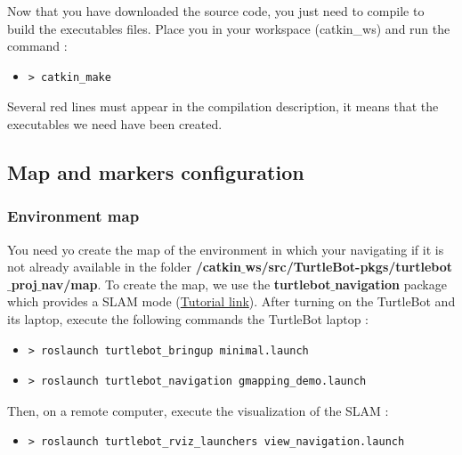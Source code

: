 \documentclass[10pt,a4paper]{article}
\begin{document}
Now that you have downloaded the source code, you just need to compile to build the executables files. Place you in your workspace (catkin\_ws) and run the command : 

\begin{itemize}
\item[]  \begin{verbatim}> catkin_make \end{verbatim}
\end{itemize}

Several red lines must appear in the compilation description, it means that the executables we need have been created.

\subsection{Map and markers configuration}

\subsubsection{Environment map}

You need yo create the map of the environment in which your navigating if it is not already available in the folder \textbf{/catkin$\_$ws/src/TurtleBot-pkgs/turtlebot$\_$proj$\_$nav/map}. To create the map, we use the \textbf{turtlebot$\_$navigation} package which provides a SLAM mode (\href{http://wiki.ros.org/turtlebot_navigation/Tutorials/indigo/Build%20a%20map%20with%20SLAM}{Tutorial link}). After turning on the TurtleBot and its laptop, execute the following commands the TurtleBot laptop :

\begin{itemize}
\item[]  \begin{verbatim}> roslaunch turtlebot_bringup minimal.launch \end{verbatim}
\item[]  \begin{verbatim}> roslaunch turtlebot_navigation gmapping_demo.launch \end{verbatim}
\end{itemize}

Then, on a remote computer, execute the visualization of the SLAM :

\begin{itemize}
\item[]  \begin{verbatim}> roslaunch turtlebot_rviz_launchers view_navigation.launch \end{verbatim}
\end{itemize}
\end{document}
